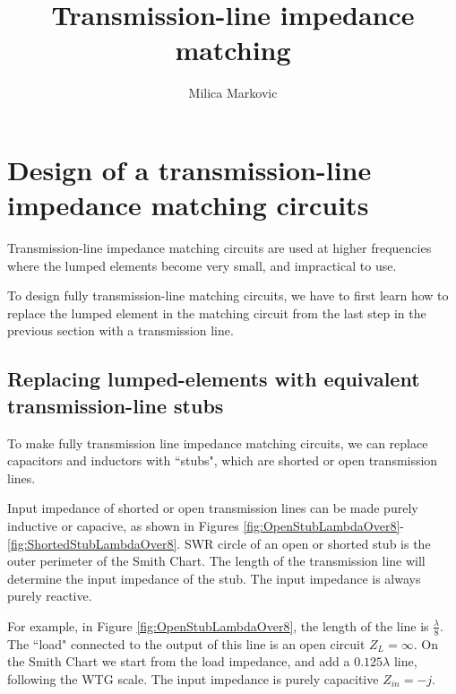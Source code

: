 \documentclass{ximera}
\title{Transmission-line impedance matching}
\author{Milica Markovic}
\begin{document}
  
\begin{abstract}  

\end{abstract}  
\maketitle    



\section{Design of a transmission-line impedance matching circuits}

Transmission-line impedance matching circuits are used at higher frequencies where the lumped elements become very small, and impractical to use. 

To design fully transmission-line matching circuits, we have to first learn how to replace the lumped element in the matching circuit from the last step in the previous section with a transmission line. 


\subsection{Replacing lumped-elements with equivalent transmission-line stubs}

To make fully transmission line impedance matching circuits, we can replace capacitors and inductors  with ``stubs", which are shorted or open transmission lines. 

Input impedance of shorted or open transmission lines  can be made purely inductive or capacive, as shown in Figures \ref{fig:OpenStubLambdaOver8}-\ref{fig:ShortedStubLambdaOver8}. SWR circle of an open or shorted stub is the outer perimeter of the Smith Chart. The length of the transmission line will determine the input impedance of the stub. The input impedance is always purely reactive. 

For example, in Figure \ref{fig:OpenStubLambdaOver8}, the length of the line is  $\frac{\lambda}{8}$. The ``load" connected to the output of this line is an open circuit $Z_L=\infty$. On the Smith Chart we start from the load impedance, and add a $0.125 \lambda$ line, following the WTG scale. The input  impedance is purely capacitive $Z_{in}=-j$. 
\end{document}
